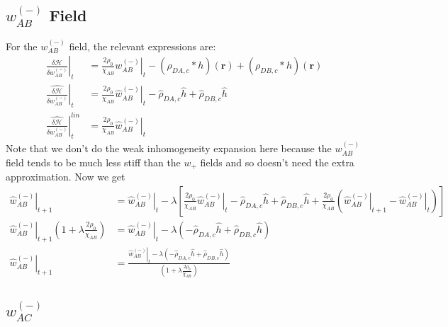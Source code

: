 \documentclass{article}
\begin{document}
  \subsection{$w_{AB}^{(-)}$ Field}
  
  For the $w_{AB}^{(-)}$ field, the relevant expressions are:
  \begin{align*}
    \left. \frac{\delta \mathcal{H}}{\delta w_{AB}^{(-)}} \right|_t &=
      \frac{2 \rho_0}{\chi_{AB}} \left. w_{AB}^{(-)} \right|_t
      - (\rho_{DA,c} \ast h)(\mathbf{r})
      + (\rho_{DB,c} \ast h)(\mathbf{r}) \\
    \left. \hat{\frac{\delta \mathcal{H}}{\delta w_{AB}^{(-)}}} \right|_t &=
      \frac{2 \rho_0}{\chi_{AB}} \left. \hat{w}_{AB}^{(-)} \right|_t
      - \hat{\rho}_{DA,c} \hat{h}
      + \hat{\rho}_{DB,c} \hat{h} \\
    \left.
      \hat{\frac{\delta \mathcal{H}}{\delta w_{AB}^{(-)}}}
    \right| ^{lin}_t &=
      \frac{2\rho_0}{\chi_{AB}} \left. \hat{w}_{AB}^{(-)} \right|_t
  \end{align*}
  Note that we don't do the weak inhomogeneity expansion here because the
    $w_{AB}^{(-)}$ field tends to be much less stiff than the $w_+$ fields and so
    doesn't need the extra approximation.
  Now we get
  \begin{align*}
    \left. \hat{w}_{AB}^{(-)} \right|_{t+1} &=
      \left. \hat{w}_{AB}^{(-)} \right|_t - \lambda \left[
        \frac{2\rho_0}{\chi_{AB}} \left. \hat{w}_{AB}^{(-)} \right|_t
        - \hat{\rho}_{DA,c} \hat{h}
        + \hat{\rho}_{DB,c} \hat{h}
        + \frac{2\rho_0}{\chi_{AB}}
          ( \left. \hat{w}_{AB}^{(-)}\right|_{t+1}
            - \left. \hat{w}_{AB}^{(-)} \right|_t
          )
      \right] \\
    \left. \hat{w}_{AB}^{(-)} \right|_{t+1} ( 1 + \lambda \frac{2
      \rho_0}{\chi_{AB}} ) &=
      \left. \hat{w}_{AB}^{(-)} \right|_t - \lambda \left(
        - \hat{\rho}_{DA,c} \hat{h}
        + \hat{\rho}_{DB,c} \hat{h}
      \right) \\
    \left. \hat{w}_{AB}^{(-)} \right|_{t+1} &=
      \frac{
        \left. \hat{w}_{AB}^{(-)} \right|_t - \lambda \left(
          - \hat{\rho}_{DA,c} \hat{h}
          + \hat{\rho}_{DB,c} \hat{h}
        \right)
      }
      {
        \left( 1 + \lambda \frac{2 \rho_0}{\chi_{AB}} \right)
      }
  \end{align*}
  
  \subsection{$w_{AC}^{(-)}$}
  
\end{document}
